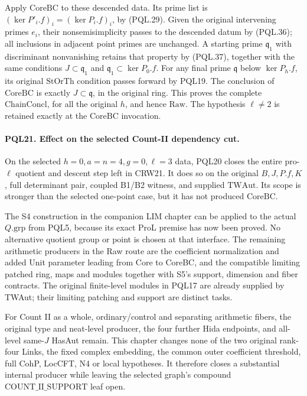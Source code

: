 Apply \(\mathrm{CoreBC}\) to these descended data.
Its prime list is
\((\ker P'_i.f)_i=(\ker P_i.f)_i\), by (PQL.29).
Given the original intervening primes \(e_i\),
their nonsemisimplicity passes to the descended
datum by (PQL.36); all inclusions in adjacent
point primes are unchanged. A starting prime
\(\mathfrak q_1\) with discriminant nonvanishing
retains that property by (PQL.37), together with
the same conditions \(J\subset\mathfrak q_1\)
and \(\mathfrak q_1\subset\ker P_0.f\).
For any final prime \(\mathfrak q\) below
\(\ker P_h.f\), its original \(\mathrm{StOrTh}\)
condition passes forward by PQL19.
The conclusion of \(\mathrm{CoreBC}\) is exactly
\(J\subset\mathfrak q\), in the original ring.
This proves the complete \(\mathrm{ChainConcl}\),
for all the original \(h\), and hence \(\mathrm{Raw}\).
The hypothesis \(\ell\ne2\) is retained exactly at
the \(\mathrm{CoreBC}\) invocation.

\paragraph{PQL21. Effect on the selected Count-II dependency cut.}
\label{claim:PQL21}
On the selected \(h=0,a=n=4,g=0,\ell=3\) data,
PQL20 closes the entire pro-\(\ell\) quotient and
descent step left in CRW21. It does so on the
original \(B,J,P.f,K\), full determinant pair,
coupled B1/B2 witness, and supplied \(\mathrm{TWAut}\).
Its scope is stronger than the selected one-point
case, but it has not produced \(\mathrm{CoreBC}\).

The S4 construction in the companion LIM chapter
can be applied to the actual \(Q.\mathrm{grp}\)
from PQL5, because its exact ProL premise has now
been proved. No alternative quotient group or
point is chosen at that interface.
The remaining arithmetic producers in the Raw
route are the coefficient normalization and added
Unit parameter leading from Core to CoreBC, and
the compatible limiting patched ring, maps and
modules together with S5's support, dimension and
fiber contracts. The original finite-level modules
in PQL17 are already supplied by TWAut; their
limiting patching and support are distinct tasks.

For Count II as a whole, ordinary/control and
separating arithmetic fibers, the original type
and neat-level producer, the four further Hida
endpoints, and all-level same-\(J\) HasAut remain.
This chapter changes none of the two original
rank-four Links, the fixed complex embedding,
the common outer coefficient threshold, full
CohP, LocCFT, N4 or local hypotheses.
It therefore closes a substantial internal
producer while leaving the selected graph's
compound \(\mathrm{COUNT\_II\_SUPPORT}\) leaf open.
